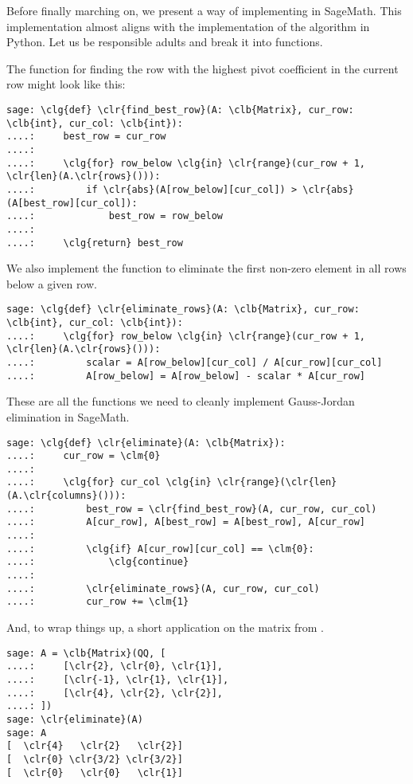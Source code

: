 Before finally marching on, we present a way of implementing
 in SageMath. This
implementation almost aligns with the implementation of the algorithm in Python.
Let us be responsible adults and break it into functions.

The function for finding the row with the highest pivot coefficient in the
current row might look like this:
\begin{Verbatim}
sage: \clg{def} \clr{find_best_row}(A: \clb{Matrix}, cur_row: \clb{int}, cur_col: \clb{int}):
....:     best_row = cur_row
....:
....:     \clg{for} row_below \clg{in} \clr{range}(cur_row + 1, \clr{len}(A.\clr{rows}())):
....:         if \clr{abs}(A[row_below][cur_col]) > \clr{abs}(A[best_row][cur_col]):
....:             best_row = row_below
....:
....:     \clg{return} best_row
\end{Verbatim}
We also implement the function to eliminate the first non-zero element in all
rows below a given row.
\begin{Verbatim}
sage: \clg{def} \clr{eliminate_rows}(A: \clb{Matrix}, cur_row: \clb{int}, cur_col: \clb{int}):
....:     \clg{for} row_below \clg{in} \clr{range}(cur_row + 1, \clr{len}(A.\clr{rows}())):
....:         scalar = A[row_below][cur_col] / A[cur_row][cur_col]
....:         A[row_below] = A[row_below] - scalar * A[cur_row]
\end{Verbatim}
These are all the functions we need to cleanly implement Gauss-Jordan
elimination in SageMath.
\begin{Verbatim}
sage: \clg{def} \clr{eliminate}(A: \clb{Matrix}):
....:     cur_row = \clm{0}
....:
....:     \clg{for} cur_col \clg{in} \clr{range}(\clr{len}(A.\clr{columns}())):
....:         best_row = \clr{find_best_row}(A, cur_row, cur_col)
....:         A[cur_row], A[best_row] = A[best_row], A[cur_row]
....:
....:         \clg{if} A[cur_row][cur_col] == \clm{0}:
....:             \clg{continue}
....:
....:         \clr{eliminate_rows}(A, cur_row, cur_col)
....:         cur_row += \clm{1}
\end{Verbatim}
And, to wrap things up, a short application on the matrix from
.
\begin{Verbatim}
sage: A = \clb{Matrix}(QQ, [
....:     [\clr{2}, \clr{0}, \clr{1}],
....:     [\clr{-1}, \clr{1}, \clr{1}],
....:     [\clr{4}, \clr{2}, \clr{2}],
....: ])
sage: \clr{eliminate}(A)
sage: A
[  \clr{4}   \clr{2}   \clr{2}]
[  \clr{0} \clr{3/2} \clr{3/2}]
[  \clr{0}   \clr{0}   \clr{1}]
\end{Verbatim}
